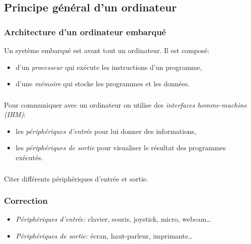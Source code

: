 \documentclass[svgnames,11pt]{beamer}
\begin{document}
\subsection{Principe général d'un ordinateur}
\begin{frame}
    \frametitle{Architecture d'un ordinateur embarqué}

    Un système embarqué est avant tout un ordinateur. Il est composé:
\begin{itemize}
    \item<1-> d'un \emph{processeur} qui exécute les instructions d'un programme,
    \item<2-> d'une \emph{mémoire} qui stocke les programmes et les données.
\end{itemize}

\end{frame}
\begin{frame}
    \frametitle{}

    Pour communiquer avec un ordinateur on utilise des \emph{interfaces homme-machine (IHM)}:
\begin{itemize}
    \item<1-> les \emph{périphériques d'entrée} pour lui donner des informations,
    \item<2-> les \emph{périphériques de sortie} pour visualiser le résultat des programmes exécutés.
\end{itemize}

\end{frame}
\begin{frame}
    \frametitle{}
    \begin{activite}
        Citer différents périphériques d'entrée et sortie.
        \end{activite}
    

\end{frame}
\begin{frame}
    \frametitle{Correction}
\begin{itemize}
    \item \emph{Périphériques d'entrée:} clavier, souris, joystick, micro, webcam\dots
    \item \emph{Périphériques de sortie: }écran, haut-parleur, imprimante\dots
\end{itemize}
    

\end{frame}
\end{document}
